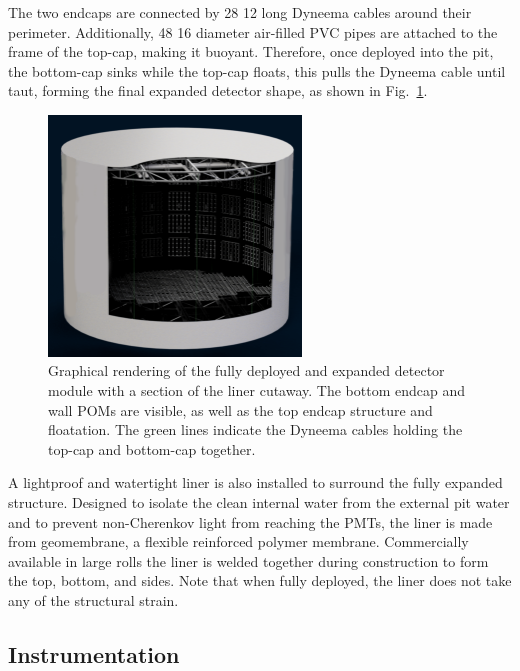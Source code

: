 The two endcaps are connected by 28 \unit{12}{} long Dyneema cables around their
perimeter. Additionally, 48 \unit{16}{} diameter air-filled PVC pipes are attached to
the frame of the top-cap, making it buoyant. Therefore, once deployed into the pit, the bottom-cap
sinks while the top-cap floats, this pulls the Dyneema cable until taut, forming the final
expanded detector shape, as shown in Fig.~\ref{fig:chips_render}.

\begin{figure} %
    \includegraphics[width=0.6\textwidth]{diagrams/4-chips/chips_render.pdf}
    \caption[Graphical rendering of the \chipsfive detector]
    {Graphical rendering of the fully deployed and expanded \chipsfive detector module with a
        section of the liner cutaway. The bottom endcap and wall POMs are visible, as well as the
        top endcap structure and floatation. The green lines indicate the Dyneema cables holding
        the top-cap and bottom-cap together.}
    \label{fig:chips_render}
\end{figure}

A lightproof and watertight liner is also installed to surround the fully expanded structure.
Designed to isolate the clean internal water from the external pit water and to prevent
non-Cherenkov light from reaching the PMTs, the liner is made from geomembrane, a flexible
reinforced polymer membrane. Commercially available in large rolls the liner is welded together
during construction to form the top, bottom, and sides. Note that when fully deployed, the liner
does not take any of the structural strain.

\subsection{Instrumentation} %
\label{sec:chips_detector_instrumentation} %

